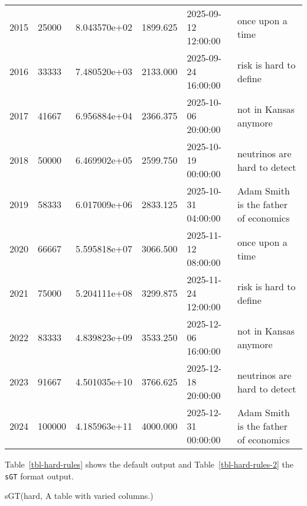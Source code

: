 \documentclass[
  11pt,
  a4paper,
  DIV=11,
  numbers=noendperiod]{scrartcl}
\newenvironment{Shaded}{\begin{snugshade}}{\end{snugshade}}
\newcommand{\NormalTok}[1]{\textcolor[rgb]{0.00,0.23,0.31}{#1}}
\newcommand{\StringTok}[1]{\textcolor[rgb]{0.13,0.47,0.30}{#1}}
\begin{document}
\begin{longtable}[]{@{}llllll@{}}
2015 & 25000 & 8.043570e+02 & 1899.625 & 2025-09-12 12:00:00 & once upon
a time \\
2016 & 33333 & 7.480520e+03 & 2133.000 & 2025-09-24 16:00:00 & risk is
hard to define \\
2017 & 41667 & 6.956884e+04 & 2366.375 & 2025-10-06 20:00:00 & not in
Kansas anymore \\
2018 & 50000 & 6.469902e+05 & 2599.750 & 2025-10-19 00:00:00 & neutrinos
are hard to detect \\
2019 & 58333 & 6.017009e+06 & 2833.125 & 2025-10-31 04:00:00 & Adam
Smith is the father of economics \\
2020 & 66667 & 5.595818e+07 & 3066.500 & 2025-11-12 08:00:00 & once upon
a time \\
2021 & 75000 & 5.204111e+08 & 3299.875 & 2025-11-24 12:00:00 & risk is
hard to define \\
2022 & 83333 & 4.839823e+09 & 3533.250 & 2025-12-06 16:00:00 & not in
Kansas anymore \\
2023 & 91667 & 4.501035e+10 & 3766.625 & 2025-12-18 20:00:00 & neutrinos
are hard to detect \\
2024 & 100000 & 4.185963e+11 & 4000.000 & 2025-12-31 00:00:00 & Adam
Smith is the father of economics \\

\end{longtable}

Table~\ref{tbl-hard-rules} shows the default output and
Table~\ref{tbl-hard-rules-2} the \texttt{sGT} format output.

\begin{Shaded}
\begin{Highlighting}[]
\NormalTok{sGT(hard, }\StringTok{\textquotesingle{}A table with varied columns.\textquotesingle{}}\NormalTok{)}
\end{Highlighting}
\end{Shaded}
\end{document}
